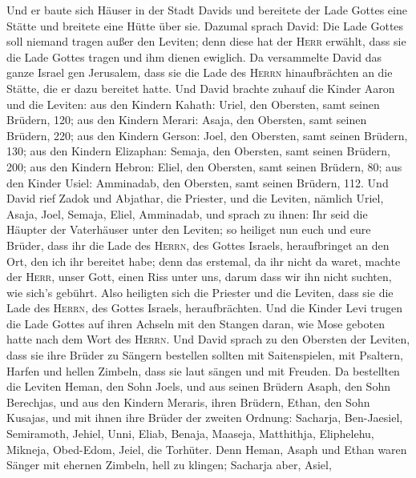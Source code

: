  Und er baute sich Häuser in der Stadt Davids und
bereitete der Lade Gottes eine Stätte und breitete eine Hütte über sie.
 Dazumal sprach David: Die Lade Gottes soll niemand tragen
außer den Leviten; denn diese hat der \textsc{Herr} erwählt, dass sie
die Lade Gottes tragen und ihm dienen ewiglich.  Da
versammelte David das ganze Israel gen Jerusalem, dass sie die Lade des
\textsc{Herrn} hinaufbrächten an die Stätte, die er dazu bereitet hatte.
 Und David brachte zuhauf die Kinder Aaron und die
Leviten:  aus den Kindern Kahath: Uriel, den Obersten,
samt seinen Brüdern, 120;  aus den Kindern Merari: Asaja,
den Obersten, samt seinen Brüdern, 220;  aus den Kindern
Gerson: Joel, den Obersten, samt seinen Brüdern, 130;  aus
den Kindern Elizaphan: Semaja, den Obersten, samt seinen Brüdern, 200;
 aus den Kindern Hebron: Eliel, den Obersten, samt seinen
Brüdern, 80;  aus den Kinder Usiel: Amminadab, den
Obersten, samt seinen Brüdern, 112.  Und David rief Zadok
und Abjathar, die Priester, und die Leviten, nämlich Uriel, Asaja, Joel,
Semaja, Eliel, Amminadab,  und sprach zu ihnen: Ihr seid
die Häupter der Vaterhäuser unter den Leviten; so heiliget nun euch und
eure Brüder, dass ihr die Lade des \textsc{Herrn}, des Gottes Israels,
heraufbringet an den Ort, den ich ihr bereitet habe; 
denn das erstemal, da ihr nicht da waret, machte der \textsc{Herr},
unser Gott, einen Riss unter uns, darum dass wir ihn nicht suchten, wie
sich's gebührt.  Also heiligten sich die Priester und die
Leviten, dass sie die Lade des \textsc{Herrn}, des Gottes Israels,
heraufbrächten.  Und die Kinder Levi trugen die Lade
Gottes auf ihren Achseln mit den Stangen daran, wie Mose geboten hatte
nach dem Wort des \textsc{Herrn}.  Und David sprach zu
den Obersten der Leviten, dass sie ihre Brüder zu Sängern bestellen
sollten mit Saitenspielen, mit Psaltern, Harfen und hellen Zimbeln, dass
sie laut sängen und mit Freuden.  Da bestellten die
Leviten Heman, den Sohn Joels, und aus seinen Brüdern Asaph, den Sohn
Berechjas, und aus den Kindern Meraris, ihren Brüdern, Ethan, den Sohn
Kusajas,  und mit ihnen ihre Brüder der zweiten Ordnung:
Sacharja, Ben-Jaesiel, Semiramoth, Jehiel, Unni, Eliab, Benaja, Maaseja,
Matthithja, Eliphelehu, Mikneja, Obed-Edom, Jeiel, die Torhüter.
 Denn Heman, Asaph und Ethan waren Sänger mit ehernen
Zimbeln, hell zu klingen;  Sacharja aber, Asiel,
